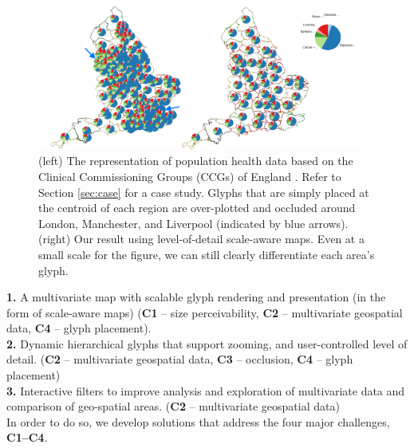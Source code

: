 \begin{figure}[t]
\centering
\includegraphics[width=0.95\textwidth]{images/ch5/ccgsetPie2}
\caption{(left) The representation of population health data based on the Clinical Commissioning Groups (CCGs) of England \cite{publicHealthEngland}. Refer to Section \ref{sec:case} for a case study. Glyphs that are simply placed at the centroid of each region are over-plotted and occluded around London, Manchester, and Liverpool (indicated by blue arrows). (right) Our result using level-of-detail scale-aware maps. Even at a small scale for the figure, we can still clearly differentiate each area's glyph.} \label{fig:ccgs}
\end{figure}


\noindent\textbf{1.} A multivariate map with scalable glyph rendering and presentation (in the form of scale-aware maps) (\textbf{C1} -- size perceivability, \textbf{C2} -- multivariate geospatial data, \textbf{C4} -- glyph placement).\\
\textbf{2.} Dynamic hierarchical glyphs that support zooming, and user-controlled level of detail. (\textbf{C2} -- multivariate geospatial data, \textbf{C3} -- occlusion, \textbf{C4} -- glyph placement)\\
\textbf{3.} Interactive filters to improve analysis and exploration of multivariate data and comparison of geo-spatial areas. (\textbf{C2} -- multivariate geospatial data)\\
In order to do so, we develop solutions that address the four major challenges, \textbf{C1--C4}.


